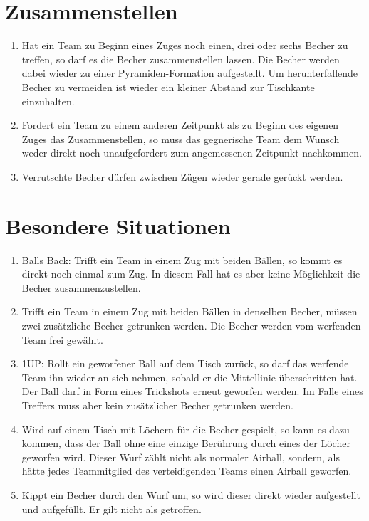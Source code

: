 \section{Zusammenstellen}
\begin{enumerate}[label={(\arabic*)}]
    \item
    Hat ein Team zu Beginn eines Zuges noch einen, drei oder sechs Becher zu treffen, so darf es die Becher zusammenstellen lassen.
    Die Becher werden dabei wieder zu einer Pyramiden-Formation aufgestellt.
    Um herunterfallende Becher zu vermeiden ist wieder ein kleiner Abstand zur Tischkante einzuhalten.

    \item
    Fordert ein Team zu einem anderen Zeitpunkt als zu Beginn des eigenen Zuges das Zusammenstellen, so muss das gegnerische Team dem Wunsch weder direkt noch unaufgefordert zum angemessenen Zeitpunkt nachkommen.

    \item
    Verrutschte Becher dürfen zwischen Zügen wieder gerade gerückt werden.
\end{enumerate}

\section{Besondere Situationen}
\begin{enumerate}[label={(\arabic*)}]
    \item
    \glqq{} Balls Back\grqq{}: Trifft ein Team in einem Zug mit beiden Bällen, so kommt es direkt noch einmal zum Zug.
    In diesem Fall hat es aber keine Möglichkeit die Becher zusammenzustellen.

    \item
    Trifft ein Team in einem Zug mit beiden Bällen in denselben Becher, müssen zwei zusätzliche Becher getrunken werden.
    Die Becher werden vom werfenden Team frei gewählt.

    \item
    \glqq{} 1UP\grqq{}: Rollt ein geworfener Ball auf dem Tisch zurück, so darf das werfende Team ihn wieder an sich nehmen, sobald er die Mittellinie überschritten hat.
    Der Ball darf in Form eines Trickshots erneut geworfen werden.
    Im Falle eines Treffers muss aber kein zusätzlicher Becher getrunken werden.

    \item
    Wird auf einem Tisch mit Löchern für die Becher gespielt, so kann es dazu kommen, dass der Ball ohne eine einzige Berührung durch eines der Löcher geworfen wird.
    Dieser Wurf zählt nicht als normaler Airball, sondern, als hätte jedes Teammitglied des verteidigenden Teams einen Airball geworfen.

    \item
    Kippt ein Becher durch den Wurf um, so wird dieser direkt wieder aufgestellt und aufgefüllt.
    Er gilt nicht als getroffen.
\end{enumerate}
